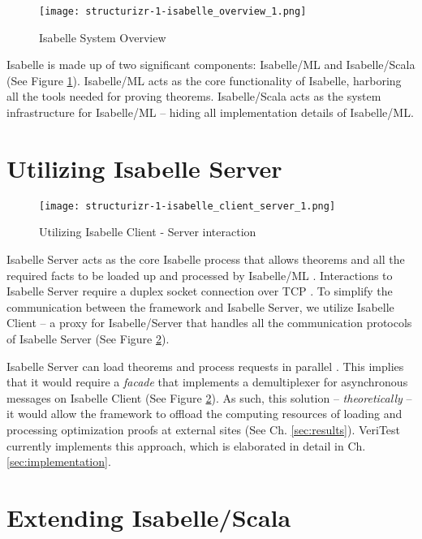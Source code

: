\begin{figure}[h]
      \centering
      \texttt{[image: structurizr-1-isabelle\_overview\_1.png]}
      \caption{Isabelle System Overview}
      \label{fig:IsabelleSystem}
\end{figure}

Isabelle is made up of two significant components: Isabelle/ML and Isabelle/Scala \cite[Ch. 5]{isabelleSystem} (See Figure \ref{fig:IsabelleSystem}). 
Isabelle/ML acts as the core functionality of Isabelle, harboring all the tools needed for proving theorems. Isabelle/Scala acts as the system 
infrastructure for Isabelle/ML -- hiding all implementation details of Isabelle/ML.

\section{Utilizing Isabelle Server}
\label{sec:IsabelleServer}

\begin{figure}[h]
      \centering
      \texttt{[image: structurizr-1-isabelle\_client\_server\_1.png]}
      \caption{Utilizing Isabelle Client - Server interaction}
      \label{fig:IsabelleServer}
\end{figure}

Isabelle Server acts as the core Isabelle process that allows theorems and all the required facts to be loaded up and processed by Isabelle/ML
\cite[Ch. 4]{isabelleSystem}. Interactions to Isabelle Server require a duplex socket connection over TCP \cite[Sec. 4.2]{isabelleSystem}. 
To simplify the communication between the framework and Isabelle Server, we utilize Isabelle Client \cite[Sec. 4.1.2]{isabelleSystem} -- a proxy 
for Isabelle/Server that handles all the communication protocols of Isabelle Server (See Figure \ref{fig:IsabelleServer}).

Isabelle Server can load theorems and process requests in parallel \cite[Sec. 4.2.6]{isabelleSystem}. This implies that it would require a 
\emph{facade} that implements a demultiplexer for asynchronous messages on Isabelle Client (See Figure \ref{fig:IsabelleServer}). As such, this 
solution -- \emph{theoretically} -- it would allow the framework to offload the computing resources of loading 
and processing optimization proofs at external sites (See Ch. \ref{sec:results}). VeriTest currently implements this approach, which is 
elaborated in detail in Ch. \ref{sec:implementation}.

\section{Extending Isabelle/Scala}
\label{sec:IsabelleScala}

